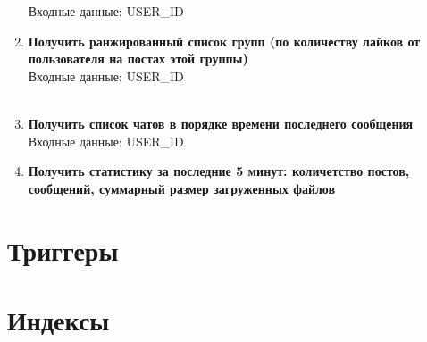 \documentclass[12pt, a4paper] {ncc}
\begin{document}
\begin{enumerate}
Входные данные: USER\_ID

\item \textbf{Получить ранжированный список групп (по количеству лайков от пользователя на постах этой группы)} \\
Входные данные: USER\_ID \\\\

\item \textbf{Получить список чатов в порядке времени последнего сообщения} \\
Входные данные: USER\_ID

\item \textbf{Получить статистику за последние 5 минут: количетство постов, сообщений, суммарный размер загруженных файлов} \\

\end{enumerate}
\section{Триггеры}

\section{Индексы}

\end{document}
